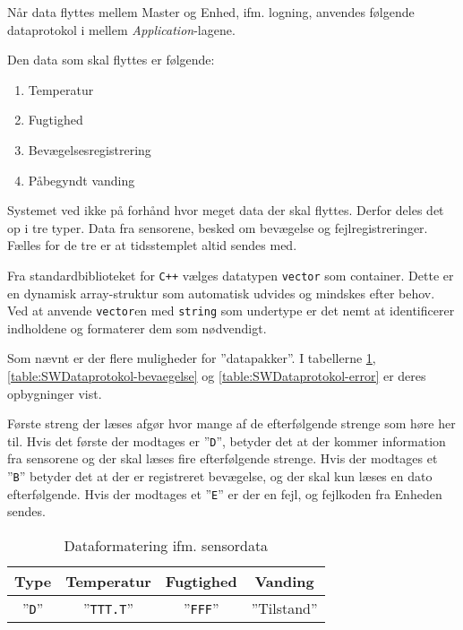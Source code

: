 
Når data flyttes mellem Master og Enhed, ifm. logning, anvendes følgende dataprotokol i mellem \textit{Application}-lagene.

Den data som skal flyttes er følgende:

\begin{enumerate}
	\item Temperatur
	\item Fugtighed
	\item Bevægelsesregistrering
	\item Påbegyndt vanding
\end{enumerate}

Systemet ved ikke på forhånd hvor meget data der skal flyttes. Derfor deles det op i tre typer. Data fra sensorene, besked om bevægelse og fejlregistreringer.
Fælles for de tre er at tidsstemplet altid sendes med.

Fra standardbiblioteket for \verb'C++' vælges datatypen \verb+vector+ som container. Dette er en dynamisk array-struktur som automatisk udvides og mindskes efter behov.
Ved at anvende \verb+vector+en med \verb+string+ som undertype er det nemt at identificerer indholdene og formaterer dem som nødvendigt.

Som nævnt er der flere muligheder for ''datapakker''. I tabellerne \ref{table:SWDataprotokol-sensor}, \ref{table:SWDataprotokol-bevaegelse} og \ref{table:SWDataprotokol-error} er deres opbygninger vist.

Første streng der læses afgør hvor mange af de efterfølgende strenge som høre her til. Hvis det første der modtages er ''\verb+D+'', betyder det at der kommer information fra sensorene og der skal læses fire efterfølgende strenge.
Hvis der modtages et ''\verb+B+'' betyder det at der er registreret bevægelse, og der skal kun læses en dato efterfølgende. Hvis der modtages et ''\verb+E+'' er der en fejl, og fejlkoden fra Enheden sendes.

\begin{table}[h]
	\caption{Dataformatering ifm. sensordata}
	\centering
	\begin{tabular}{|c|c|c|c|}
		\hline 
		\textbf{Type} & \textbf{Temperatur} & \textbf{Fugtighed} & \textbf{Vanding} \\ 
		\hline 
		''\verb+D+'' & ''\verb+TTT.T+'' & ''\verb+FFF+'' & ''Tilstand'' \\ 
		\hline 
	\end{tabular} 
	\label{table:SWDataprotokol-sensor}
\end{table}

